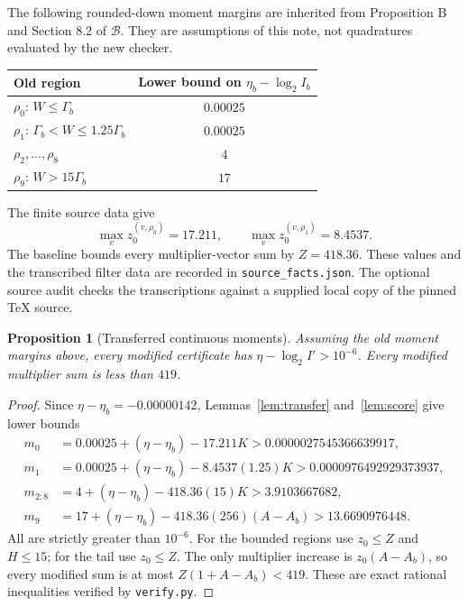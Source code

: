 \documentclass[11pt,a4paper]{article}
\newtheorem{proposition}[theorem]{Proposition}
\theoremstyle{remark}
\newcommand{\Base}{\ensuremath{\mathcal{B}}}
\newcommand{\logtwo}{\log_2}
\begin{document}
The following rounded-down moment margins are inherited from
Proposition B and Section 8.2 of \Base. They are assumptions of this
note, not quadratures evaluated by the new checker.
\begin{center}
\begin{tabular}{@{}lc@{}}
\toprule
Old region & Lower bound on $\eta_b-\logtwo I_b$\\
\midrule
$\rho_0$: $W\le\Gamma_b$ & $0.00025$\\
$\rho_1$: $\Gamma_b<W\le1.25\Gamma_b$ & $0.00025$\\
$\rho_2,\ldots,\rho_8$ & $4$\\
$\rho_9$: $W>15\Gamma_b$ & $17$\\
\bottomrule
\end{tabular}
\end{center}
The finite source data give
\[
 \max_v z_0^{(v,\rho_0)}=17.211,\qquad
 \max_v z_0^{(v,\rho_1)}=8.4537.
\]
The baseline bounds every multiplier-vector sum by $Z=418.36$.
These values and the transcribed filter data are recorded in
\texttt{source\_facts.json}. The optional source audit checks the
transcriptions against a supplied local copy of the pinned TeX source.

\begin{proposition}[Transferred continuous moments]
\label{prop:moments}
Assuming the old moment margins above, every modified certificate has
$\eta-\logtwo I'>10^{-6}$. Every modified multiplier sum is less than
$419$.
\end{proposition}
\begin{proof}
Since $\eta-\eta_b=-0.00000142$, Lemmas~\ref{lem:transfer}
and~\ref{lem:score} give lower bounds
\begin{align*}
 m_0&=0.00025+(\eta-\eta_b)-17.211K
       >0.0000027545366639917,\\
 m_1&=0.00025+(\eta-\eta_b)-8.4537(1.25)K
       >0.0000976492929373937,\\
 m_{2:8}&=4+(\eta-\eta_b)-418.36(15)K
       >3.9103667682,\\
 m_9&=17+(\eta-\eta_b)-418.36(256)(A-A_b)
       >13.6690976448.
\end{align*}
All are strictly greater than $10^{-6}$. For the bounded regions use
$z_0\le Z$ and $H\le15$; for the tail use $z_0\le Z$.
The only multiplier increase is $z_0(A-A_b)$, so every modified sum
is at most $Z(1+A-A_b)<419$. These are exact rational inequalities
verified by \texttt{verify.py}.
\end{proof}
\end{document}
